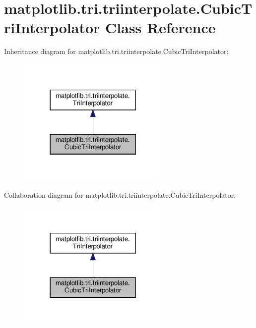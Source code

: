 \hypertarget{classmatplotlib_1_1tri_1_1triinterpolate_1_1CubicTriInterpolator}{}\section{matplotlib.\+tri.\+triinterpolate.\+Cubic\+Tri\+Interpolator Class Reference}
\label{classmatplotlib_1_1tri_1_1triinterpolate_1_1CubicTriInterpolator}


Inheritance diagram for matplotlib.\+tri.\+triinterpolate.\+Cubic\+Tri\+Interpolator\+:
\nopagebreak
\begin{figure}[H]
\begin{center}
\leavevmode
\includegraphics[width=209pt]{classmatplotlib_1_1tri_1_1triinterpolate_1_1CubicTriInterpolator__inherit__graph}
\end{center}
\end{figure}


Collaboration diagram for matplotlib.\+tri.\+triinterpolate.\+Cubic\+Tri\+Interpolator\+:
\nopagebreak
\begin{figure}[H]
\begin{center}
\leavevmode
\includegraphics[width=209pt]{classmatplotlib_1_1tri_1_1triinterpolate_1_1CubicTriInterpolator__coll__graph}
\end{center}
\end{figure}
